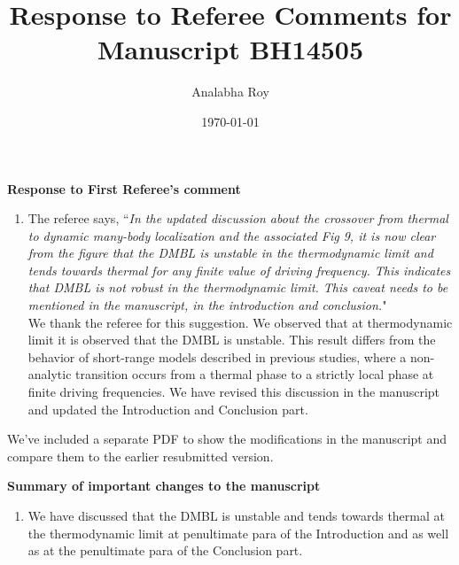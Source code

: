 \documentclass[aps,prb,reprint,showpacs,floatfix,superscriptaddress, onecolumn, nofootinbib, 10pt]{revtex4-2}
\newcommand{\response}[1]{{\color{black}#1}} %
\newcommand{\comment}[1]{{\color{blue}#1}} %
\begin{document}
	
	\title{Response to Referee Comments for Manuscript BH14505}
	\author{Analabha Roy}
	\date{\today}
	
	\maketitle
	
	\vspace{1em}
	
	\noindent \textbf{Response to First Referee's comment}
	
	\begin{enumerate}
		\item The referee says, \comment{``\textit{In the updated discussion about the crossover from thermal to dynamic many-body localization and the associated Fig 9, it is now clear from the figure that the DMBL is unstable in the thermodynamic limit and tends towards thermal for any finite value of driving frequency. This indicates that DMBL is not robust in the thermodynamic limit. This caveat needs to be mentioned in the manuscript, in the introduction	and conclusion.}"}\\
		
		\response{
			We thank the referee for this suggestion. 
			We observed that at thermodynamic limit it is observed that the DMBL is unstable. This result differs from the behavior of short-range models described in previous studies, where a non-analytic transition occurs from a thermal phase to a strictly local phase at finite driving frequencies. We have revised this discussion in the manuscript and updated the Introduction and Conclusion part.
		}
	\end{enumerate}

	We've included a separate PDF to show the modifications in the manuscript and compare them to the earlier resubmitted version.
	
	\vspace{1cm}
	
	\noindent \textbf{Summary of important changes to the  manuscript}
	\begin{enumerate}
		\item We have discussed that the DMBL is unstable and tends towards thermal at the thermodynamic limit at penultimate para of the Introduction and as well as at the penultimate para of the Conclusion part.
	\end{enumerate}
	
\end{document}
